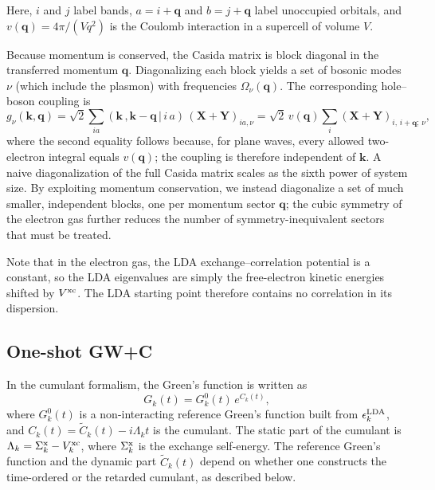 \documentclass[%
 reprint,
 amsmath,amssymb,
 aps,
]{revtex4-2}
\begin{document}
Here, $i$ and $j$ label bands, $a = i + \mathbf{q}$ and $b = j + \mathbf{q}$ label unoccupied orbitals, and $v(\mathbf{q}) = 4\pi/(V q^2)$ is the Coulomb interaction in a supercell of volume $V$.

Because momentum is conserved, the Casida matrix is block diagonal in the transferred momentum $\mathbf{q}$. Diagonalizing each block yields a set of bosonic modes $\nu$ (which include the plasmon) with frequencies $\Omega_\nu(\mathbf{q})$. The corresponding hole--boson coupling is
\begin{equation}
g_{\nu}(\mathbf{k},\mathbf{q}) = \sqrt{2}\sum_{ia} (\mathbf{k}\,,\mathbf{k}-\mathbf{q}\,|\,i\,a)\,(\mathbf{X}+\mathbf{Y})_{ia,\nu}
= \sqrt{2}\,v(\mathbf{q})\sum_{i}(\mathbf{X}+\mathbf{Y})_{i,\,i+\mathbf{q};\,\nu},
\label{eq:coupling}
\end{equation}
where the second equality follows because, for plane waves, every allowed two-electron integral equals $v(\mathbf{q})$; the coupling is therefore independent of $\mathbf{k}$. A naive diagonalization of the full Casida matrix scales as the sixth power of system size. By exploiting momentum conservation, we instead diagonalize a set of much smaller, independent blocks, one per momentum sector $\mathbf{q}$; the cubic symmetry of the electron gas further reduces the number of symmetry-inequivalent sectors that must be treated.

Note that in the electron gas, the LDA exchange--correlation potential is a constant, so the LDA eigenvalues are simply the free-electron kinetic energies shifted by $V^{\rm xc}$. The LDA starting point therefore contains no correlation in its dispersion.

\subsection{One-shot {GW}+C}
\label{sec:gwc}
In the cumulant formalism, the Green's function is written as
\begin{equation}
G_k(t) = G_k^{0}(t)\, e^{C_k(t)},
\label{eq:cumulant}
\end{equation}
where $G_k^{0}(t)$ is a non-interacting reference Green's function built from $\epsilon_k^{\rm LDA}$, and $C_k(t) = \tilde{C}_k(t) - i\Lambda_k t$ is the cumulant. The static part of the cumulant is $\Lambda_k = \Sigma_k^{\rm x} - V_k^{\rm xc}$, where $\Sigma_k^{\rm x}$ is the exchange self-energy. The reference Green's function and the dynamic part $\tilde{C}_k(t)$ depend on whether one constructs the time-ordered or the retarded cumulant, as described below.
\end{document}
